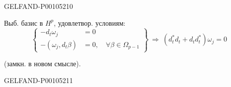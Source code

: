 \begin{GelfandAdjacentEvidence}{GELFAND-P001052}{10}


Выб. базис в $H^p$, удовлетвор. условиям:
\begin{equation*}
\left\{
\begin{aligned}
-d_t\omega_j&=0\\
-(\omega_j,d_t\beta)&=0,\quad\forall\beta\in\Omega_{p-1}
\end{aligned}
\right\}
\ \Rightarrow\
(d_t^*d_t+d_t d_t^*)\omega_j=0
\tag{1}
\end{equation*}
\begin{flushright}(замкн. в новом смысле).\end{flushright}
\end{GelfandAdjacentEvidence}
\begin{GelfandAdjacentEvidence}{GELFAND-P001052}{11}

\end{GelfandAdjacentEvidence}



